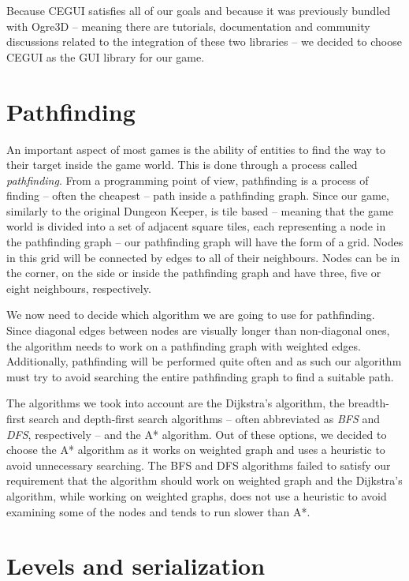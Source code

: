 Because CEGUI satisfies all of our goals and because it was previously bundled with Ogre3D -- meaning there are tutorials, documentation
and community discussions related to the integration of these two libraries -- we decided to choose CEGUI as the GUI library for our game.

\section{Pathfinding}

An important aspect of most games is the ability of entities to find the way to their target inside the game world. This is done through
a process called \emph{pathfinding}. From a programming point of view, pathfinding is a process of finding -- often the cheapest -- path
inside a pathfinding graph. Since our game, similarly to the original Dungeon Keeper, is tile based -- meaning that the game world
is divided into a set of adjacent square tiles, each representing a node in the pathfinding graph -- our pathfinding graph will have the
form of a grid. Nodes in this grid will be connected by edges to all of their neighbours. Nodes can be in the corner, on the side
or inside the pathfinding graph and have three, five or eight neighbours, respectively.

We now need to decide which algorithm we are going to use for pathfinding. Since diagonal edges between nodes are visually longer than
non-diagonal ones, the algorithm needs to work on a pathfinding graph with weighted edges. Additionally, pathfinding will be performed
quite often and as such our algorithm must try to avoid searching the entire pathfinding graph to find a suitable path.

The algorithms we took into account are the Dijkstra's algorithm, the breadth-first search and depth-first search algorithms 
-- often abbreviated as \emph{BFS} and \emph{DFS}, respectively -- and the A* algorithm. Out of these options, we decided to choose
the A* algorithm as it works on weighted graph and uses a heuristic to avoid unnecessary searching. The BFS and DFS algorithms failed
to satisfy our requirement that the algorithm should work on weighted graph and the Dijkstra's algorithm, while working on weighted
graphs, does not use a heuristic to avoid examining some of the nodes and tends to run slower than A*.

\section{Levels and serialization}


